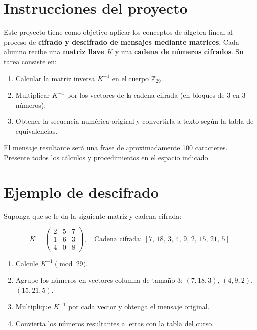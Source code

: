 \documentclass{article}%
\begin{document}
%
\12pt%
\section*{Instrucciones del proyecto}

Este proyecto tiene como objetivo aplicar los conceptos de álgebra lineal al proceso de
\textbf{cifrado y descifrado de mensajes mediante matrices}.
Cada alumno recibe una \textbf{matriz llave $K$} y una \textbf{cadena de números cifrados}.
Su tarea consiste en:

\begin{enumerate}
    \item Calcular la matriz inversa $K^{-1}$ en el cuerpo $\mathbb{Z}_{29}$.
    \item Multiplicar $K^{-1}$ por los vectores de la cadena cifrada (en bloques de 3 en 3 números).
    \item Obtener la secuencia numérica original y convertirla a texto según la tabla de equivalencias.
\end{enumerate}

El mensaje resultante será una frase de aproximadamente 100 caracteres.
Presente todos los cálculos y procedimientos en el espacio indicado.

\bigskip
\section*{Ejemplo de descifrado}

Suponga que se le da la siguiente matriz y cadena cifrada:

\[
K =
\begin{pmatrix}
2 & 5 & 7 \\
1 & 6 & 3 \\
4 & 0 & 8
\end{pmatrix},
\quad
\text{Cadena cifrada: } [7,\, 18,\, 3,\, 4,\, 9,\, 2,\, 15,\, 21,\, 5]
\]

\begin{enumerate}
    \item Calcule $K^{-1} \pmod{29}$.
    \item Agrupe los números en vectores columna de tamaño 3: $(7,18,3)$, $(4,9,2)$, $(15,21,5)$.
    \item Multiplique $K^{-1}$ por cada vector y obtenga el mensaje original.
    \item Convierta los números resultantes a letras con la tabla del curso.
\end{enumerate}
\end{document}
